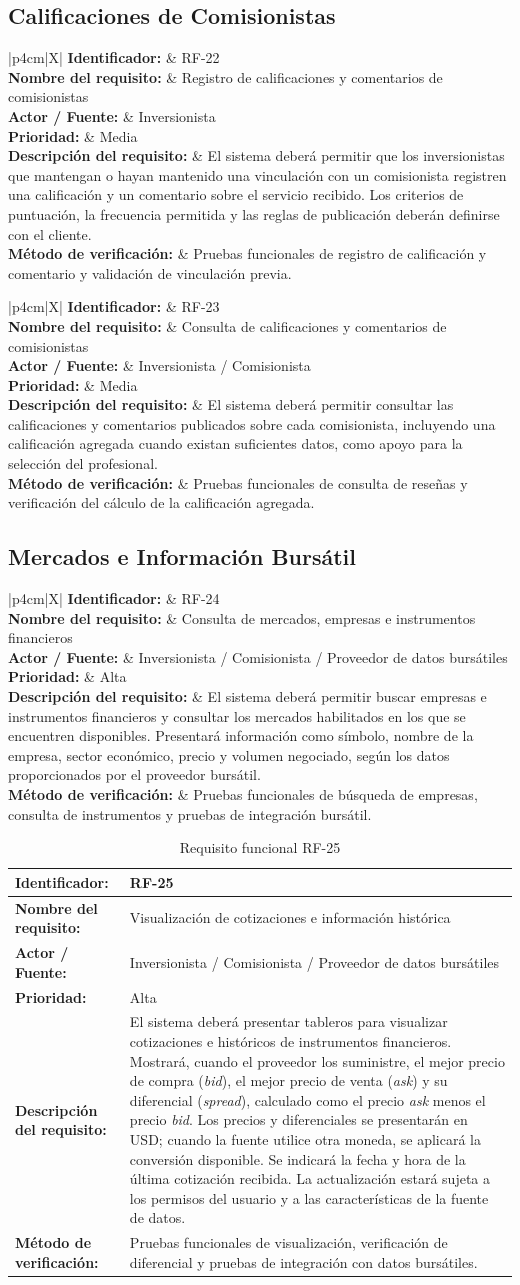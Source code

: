 \documentclass[11pt,a4paper,oneside]{article}
\newcommand{\tablaRequisito}[6]{%
\begin{table}[H]
\centering
\begin{tabularx}{\linewidth}{|p{4cm}|X|}
\hline
\textbf{Identificador:} & #1 \\ \hline
\textbf{Nombre del requisito:} & #2 \\ \hline
\textbf{Actor / Fuente:} & #3 \\ \hline
\textbf{Prioridad:} & #4 \\ \hline
\textbf{Descripción del requisito:} &
#5 \\ \hline
\textbf{Método de verificación:} & #6 \\ \hline
\end{tabularx}
\caption{Requisito funcional #1}
\label{tab:#1}
\end{table}
}
\begin{document}
\subsection{Calificaciones de Comisionistas}

\tablaRequisito
{RF-22}
{Registro de calificaciones y comentarios de comisionistas}
{Inversionista}
{Media}
{El sistema deberá permitir que los inversionistas que mantengan o hayan mantenido una vinculación con un comisionista registren una calificación y un comentario sobre el servicio recibido. Los criterios de puntuación, la frecuencia permitida y las reglas de publicación deberán definirse con el cliente.}
{Pruebas funcionales de registro de calificación y comentario y validación de vinculación previa.}


\tablaRequisito
{RF-23}
{Consulta de calificaciones y comentarios de comisionistas}
{Inversionista / Comisionista}
{Media}
{El sistema deberá permitir consultar las calificaciones y comentarios publicados sobre cada comisionista, incluyendo una calificación agregada cuando existan suficientes datos, como apoyo para la selección del profesional.}
{Pruebas funcionales de consulta de reseñas y verificación del cálculo de la calificación agregada.}


\subsection{Mercados e Información Bursátil}

\tablaRequisito
{RF-24}
{Consulta de mercados, empresas e instrumentos financieros}
{Inversionista / Comisionista / Proveedor de datos bursátiles}
{Alta}
{El sistema deberá permitir buscar empresas e instrumentos financieros y consultar los mercados habilitados en los que se encuentren disponibles. Presentará información como símbolo, nombre de la empresa, sector económico, precio y volumen negociado, según los datos proporcionados por el proveedor bursátil.}
{Pruebas funcionales de búsqueda de empresas, consulta de instrumentos y pruebas de integración bursátil.}


\tablaRequisito
{RF-25}
{Visualización de cotizaciones e información histórica}
{Inversionista / Comisionista / Proveedor de datos bursátiles}
{Alta}
{El sistema deberá presentar tableros para visualizar cotizaciones e históricos de instrumentos financieros. Mostrará, cuando el proveedor los suministre, el mejor precio de compra (\textit{bid}), el mejor precio de venta (\textit{ask}) y su diferencial (\textit{spread}), calculado como el precio \textit{ask} menos el precio \textit{bid}. Los precios y diferenciales se presentarán en USD; cuando la fuente utilice otra moneda, se aplicará la conversión disponible. Se indicará la fecha y hora de la última cotización recibida. La actualización estará sujeta a los permisos del usuario y a las características de la fuente de datos.}
{Pruebas funcionales de visualización, verificación de diferencial y pruebas de integración con datos bursátiles.}
\end{document}
